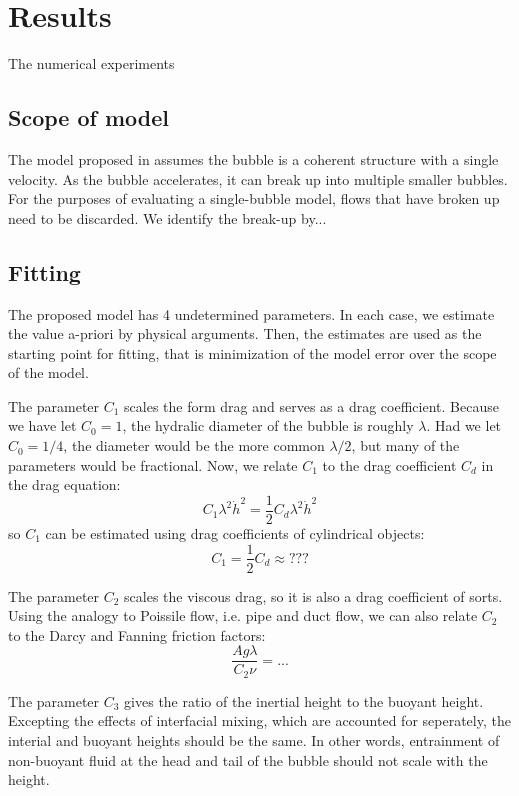 \section{Results}

The numerical experiments 

\subsection{Scope of model}

The model proposed in  assumes the bubble is a coherent structure with a single velocity.
As the bubble accelerates, it can break up into multiple smaller bubbles.
For the purposes of evaluating a single-bubble model, flows that have broken up need to be discarded.
We identify the break-up by...

\subsection{Fitting}
The proposed model has 4 undetermined parameters.
In each case, we estimate the value a-priori by physical arguments.
Then, the estimates are used as the starting point for fitting, that is minimization of the model error over the scope of the model.

The parameter $C_1$ scales the form drag and serves as a drag coefficient.  
Because we have let $C_0 = 1$, the hydralic diameter of the bubble is roughly $\lambda$.
Had we let $C_0 = 1/4$, the diameter would be the more common $\lambda/2$, but many of the parameters would be fractional.
Now, we relate $C_1$ to the drag coefficient $C_d$ in the drag equation:
\begin{equation}
C_1 \lambda^2 \dot{h}^2 = \frac{1}{2} C_d \lambda^2 \dot{h}^2
\end{equation}
so $C_1$ can be estimated using drag coefficients of cylindrical objects:
\begin{equation}
C_1 = \frac{1}{2} C_d \approx ???
\end{equation}

The parameter $C_2$ scales the viscous drag, so it is also a drag coefficient of sorts.
Using the analogy to Poissile flow, i.e. pipe and duct flow, we can also relate $C_2$ to the Darcy and Fanning friction factors:
\begin{equation}
\frac{A g \lambda}{C_2 \nu} = ...
\end{equation}

The parameter $C_3$ gives the ratio of the inertial height to the buoyant height.
Excepting the effects of interfacial mixing, which are accounted for seperately, the interial and buoyant heights should be the same.
In other words, entrainment of non-buoyant fluid at the head and tail of the bubble should not scale with the height.

